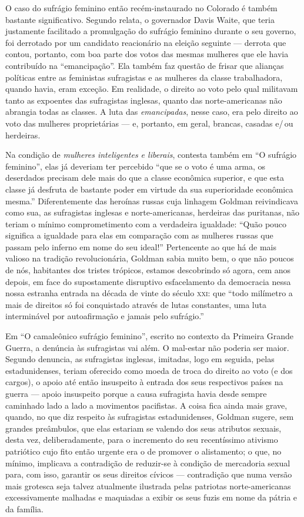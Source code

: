 O caso do sufrágio feminino então recém-instaurado
no Colorado é também bastante significativo. Segundo relata, o
governador Davis Waite, que teria justamente facilitado a promulgação do
sufrágio feminino durante o seu governo, foi derrotado por um candidato
reacionário na eleição seguinte --- derrota que contou, portanto, com boa
parte dos votos das mesmas mulheres que ele havia contribuído na
``emancipação''. Ela também faz questão de frisar que alianças políticas
entre as feministas sufragistas e as mulheres da classe trabalhadora,
quando havia, eram exceção. Em realidade, o direito ao voto pelo qual
militavam tanto as expoentes das sufragistas inglesas, quanto das
norte-americanas não abrangia todas as classes. A luta das
\textit{emancipadas}, nesse caso, era pelo direito ao voto das mulheres
proprietárias --- e, portanto, em geral, brancas, casadas e/\,ou herdeiras.

Na condição de \textit{mulheres inteligentes e liberais}, contesta também em
``O sufrágio feminino'', elas já deveriam ter percebido ``que se o voto
é uma arma, os deserdados precisam dele mais do que a classe econômica
superior, e que esta classe já desfruta de bastante poder em virtude da
sua superioridade econômica mesma.'' Diferentemente das heroínas russas
cuja linhagem Goldman reivindicava como sua, as sufragistas inglesas e
norte-americanas, herdeiras das puritanas, não teriam o mínimo
comprometimento com a verdadeira igualdade: ``Quão pouco significa a
igualdade para elas em comparação com as mulheres russas que passam pelo
inferno em nome do seu ideal!'' Pertencente ao que há de mais valioso na
tradição revolucionária, Goldman sabia muito bem, o que não poucos de
nós, habitantes dos tristes trópicos, estamos descobrindo só agora, cem
anos depois, em face do supostamente disruptivo esfacelamento da
democracia nessa nossa estranha entrada na década de vinte do século
\textsc{xxi}: que ``todo milímetro a mais de direitos só foi conquistado através
de lutas constantes, uma luta interminável por autoafirmação e jamais
pelo sufrágio.''

Em ``O camaleônico sufrágio feminino'', escrito no contexto da Primeira
Grande Guerra, a denúncia às sufragistas vai além. O mal-estar não
poderia ser maior. Segundo denuncia, as sufragistas inglesas, imitadas,
logo em seguida, pelas estadunidenses, teriam oferecido como moeda de
troca do direito ao voto (e dos cargos), o apoio até então insuspeito à
entrada dos seus respectivos países na guerra --- apoio insuspeito porque
a causa sufragista havia desde sempre caminhado lado a lado a movimentos
pacifistas. A coisa fica ainda mais grave, quando, no que diz respeito
às sufragistas estadunidenses, Goldman sugere, sem grandes preâmbulos,
que elas estariam se valendo dos seus atributos sexuais, desta vez,
deliberadamente, para o incremento do seu recentíssimo ativismo
patriótico cujo fito então urgente era o de promover o alistamento; o
que, no mínimo, implicava a contradição de reduzir-se à condição de
mercadoria sexual para, com isso, garantir os seus direitos cívicos ---
contradição que numa versão mais grotesca seja talvez atualmente
ilustrada pelas patriotas norte-americanas excessivamente malhadas e
maquiadas a exibir os seus fuzis em nome da pátria e da família. 

